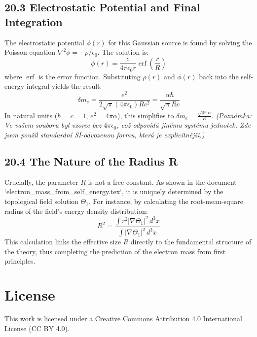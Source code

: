\documentclass[12pt, a4paper]{article}
\begin{document}
\subsection*{20.3 Electrostatic Potential and Final Integration}
The electrostatic potential \( \phi(r) \) for this Gaussian source is found by solving the Poisson equation \( \nabla^2 \phi = -\rho/\epsilon_0 \). The solution is:
\begin{equation}
    \phi(r) = \frac{e}{4\pi\epsilon_0 r} \operatorname{erf}\left( \frac{r}{R} \right)
\end{equation}
where \( \operatorname{erf} \) is the error function. Substituting \( \rho(r) \) and \( \phi(r) \) back into the self-energy integral yields the result:
\begin{equation}
    \delta m_e = \frac{e^2}{2\sqrt{\pi} (4\pi\epsilon_0) R c^2} = \frac{\alpha \hbar}{\sqrt{\pi} R c}
\end{equation}
In natural units (\(\hbar=c=1\), \( e^2 = 4\pi\alpha \)), this simplifies to \( \delta m_e = \frac{\sqrt{4\pi}\alpha}{R} \).
\textit{(Poznámka: Ve vašem souboru byl vzorec bez \(4\pi\epsilon_0\), což odpovídá jinému systému jednotek. Zde jsem použil standardní SI-odvozenou formu, která je explicitnější.)}

\subsection*{20.4 The Nature of the Radius R}
Crucially, the parameter \(R\) is not a free constant. As shown in the document `electron_mass_from_self_energy.tex`, it is uniquely determined by the topological field solution \(\Theta_1\). For instance, by calculating the root-mean-square radius of the field's energy density distribution:
\begin{equation}
    R^2 = \frac{\int r^2 |\nabla \Theta_1|^2 \, d^3x}{\int |\nabla \Theta_1|^2 \, d^3x}
\end{equation}
This calculation links the effective size \(R\) directly to the fundamental structure of the theory, thus completing the prediction of the electron mass from first principles.


\section*{License}
This work is licensed under a Creative Commons Attribution 4.0 International License (CC BY 4.0).
\end{document}
